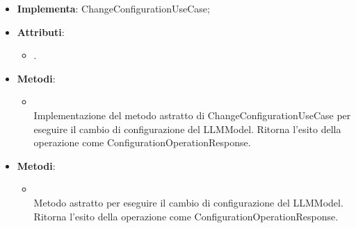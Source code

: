 \documentclass[10pt, a4paper]{article}
\begin{document}
\label{ChangeConfigurationServiceDettaglio}
\begin{itemize}
    \item \textbf{Implementa}: ChangeConfigurationUseCase;
    \item \textbf{Attributi}:
    \begin{itemize}
        \item {}.
    \end{itemize}
    \item \textbf{Metodi}:
    \begin{itemize}
        \item {}\\
        Implementazione del metodo astratto di ChangeConfigurationUseCase per eseguire il cambio di configurazione del LLMModel. Ritorna l'esito della operazione come ConfigurationOperationResponse.
    \end{itemize}
\end{itemize}



\label{ChangeConfigurationUseCaseDettaglio}
\begin{itemize}
    \item \textbf{Metodi}:
    \begin{itemize}
        \item {}\\
        Metodo astratto per eseguire il cambio di configurazione del LLMModel. Ritorna l'esito della operazione come ConfigurationOperationResponse.
    \end{itemize}
\end{itemize}
\end{document}
